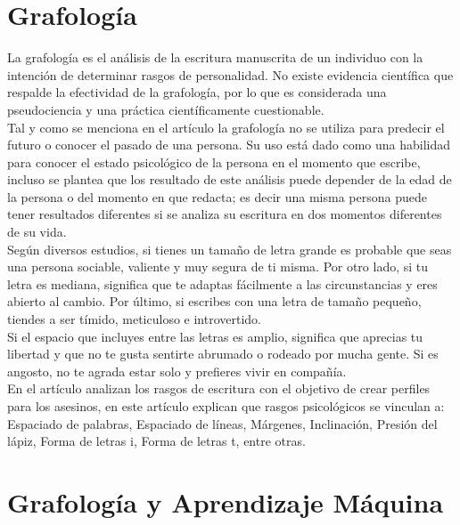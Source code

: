 \documentclass[10pt, a4paper]{article}
\begin{document}
    \section{Grafolog\'ia}
    
        La grafología es el análisis de la escritura manuscrita de un individuo con la intención de determinar rasgos de personalidad. 
        No existe evidencia científica que respalde la efectividad de la grafología, por lo que es considerada una pseudociencia 
        y una práctica científicamente cuestionable.\\ 


        Tal y como se menciona en el art\'iculo \cite{vyawahare2022graphology} la grafolog\'ia no se utiliza para predecir el futuro o conocer el pasado de una persona. Su uso 
        est\'a dado como una habilidad para conocer el estado psicol\'ogico de la persona en el momento que escribe, incluso se plantea que los resultado de este an\'alisis 
        puede depender de la edad de la persona o del momento en que redacta; es decir una misma persona puede tener resultados diferentes si se analiza su escritura en dos momentos 
        diferentes de su vida.\\

        Según diversos estudios, si tienes un tamaño de letra grande es probable que seas una persona sociable, valiente y muy segura de ti misma. 
        Por otro lado, si tu letra es mediana, significa que te adaptas fácilmente a las circunstancias y eres abierto al cambio. 
        Por \'ultimo, si escribes con una letra de tamaño pequeño, tiendes a ser tímido, meticuloso e introvertido.\\

        Si el espacio que incluyes entre las letras es amplio, significa que aprecias tu libertad y que no te gusta sentirte abrumado o rodeado por mucha gente. 
        Si es angosto, no te agrada estar solo y prefieres vivir en compañía.\\

        En el art\'iculo \cite{mishra2017forensic} analizan los rasgos de escritura con el objetivo de crear perfiles para los asesinos, en este art\'iculo explican que 
        rasgos psicol\'ogicos se vinculan a: Espaciado de palabras, Espaciado de l\'ineas, M\'argenes, Inclinaci\'on, Presi\'on del l\'apiz, Forma de letras i, Forma de letras t, entre otras. \\ 


    
    \section{Grafolog\'ia y Aprendizaje M\'aquina}
    
\end{document}
